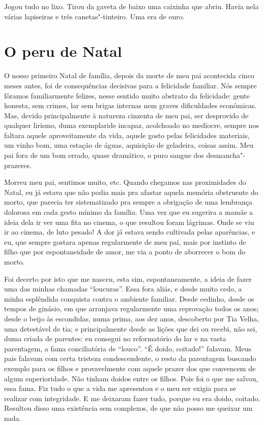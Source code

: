 Jogou tudo no lixo. Tirou da gaveta de baixo uma caixinha que abriu.
Havia nela várias lapiseiras e três canetas"-tinteiro. Uma era de ouro.

\chapter{O peru de Natal}

O nosso primeiro Natal de família, depois da morte de meu pai acontecida
cinco meses antes, foi de consequências decisivas para a felicidade
familiar. Nós sempre fôramos familiarmente felizes, nesse sentido muito
abstrato da felicidade: gente honesta, sem crimes, lar sem brigas
internas nem graves dificuldades econômicas. Mas, devido principalmente
à natureza cinzenta de meu pai, ser desprovido de qualquer lirismo, duma
exemplaride incapaz, acolchoado no medíocre, sempre nos faltara aquele
aproveitamente da vida, aquele gosto pelas felicidades materiais, um
vinho bom, uma estação de águas, aquisição de geladeira, coisas assim.
Meu pai fora de um bom errado, quase dramático, o puro sangue dos
desmancha"-prazeres.

Morreu meu pai, sentimos muito, etc. Quando chegamos nas proximidades do
Natal, eu já estava que não podia mais pra afastar aquela memória
obstruente do morto, que parecia ter sistematizado pra sempre a
obrigação de uma lembrança dolorosa em cada gesto mínimo da família. Uma
vez que eu sugerira a mamãe a ideia dela ir ver uma fita no cinema, o
que resultou foram lágrimas. Onde se viu ir ao cinema, de luto pesado! A
dor já estava sendo cultivada pelas aparências, e eu, que sempre gostara
apenas regularmente de meu pai, mais por instinto de filho que por
espontaneidade de amor, me via a ponto de aborrecer o bom do morto.

Foi decerto por isto que me nasceu, esta sim, espontaneamente, a ideia
de fazer uma das minhas chamadas ``loucuras''. Essa fora aliás, e desde
muito cedo, a minha esplêndida conquista contra o ambiente familiar.
Desde cedinho, desde os tempos de ginásio, em que arranjava regularmente
uma reprovação todos os anos; desde o beijo às escondidas, numa prima,
aos dez anos, descoberto por Tia Velha, uma detestável de tia; e
principalmente desde as lições que dei ou recebi, não sei, duma criada
de parentes: eu consegui no reformatório do lar e na vasta parentagem, a
fama conciliatória de ``louco''. ``É doido, coitado!'' falavam. Meus
pais falavam com certa tristeza condescendente, o resto da parentagem
buscando exemplo para os filhos e provavelmente com aquele prazer dos
que convencem de algum superioridade. Não tinham doidos entre os filhos.
Pois foi o que me salvou, essa fama. Fiz tudo o que a vida me apresentou
e o meu ser exigia para se realizar com integridade. E me deixaram fazer
tudo, porque eu era doido, coitado. Resultou disso uma existência sem
complexos, de que não posso me queixar um nada.

